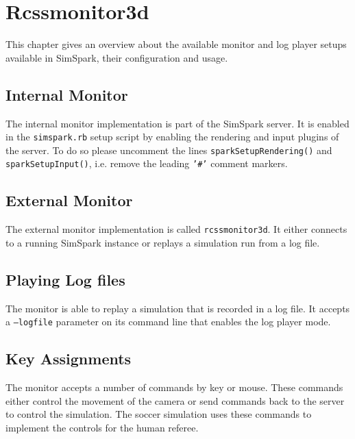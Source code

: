 \chapter{Rcssmonitor3d}
\label{cha:rcssmonitor3d}

This chapter gives an overview about the available monitor and log
player setups available in SimSpark, their configuration and usage.

\section{Internal Monitor}

The internal monitor implementation is part of the SimSpark server. It
is enabled in the \texttt{simspark.rb} setup script by enabling the
rendering and input plugins of the server. To do so please uncomment
the lines \texttt{sparkSetupRendering()} and
\texttt{sparkSetupInput()}, i.e. remove the leading \texttt{'\#'} comment markers.

\section{External Monitor}

The external monitor implementation is called
\texttt{rcssmonitor3d}. It either connects to a running SimSpark
instance or replays a simulation run from a log file.

\section{Playing Log files}

The monitor is able to replay a simulation that is recorded in a log
file. It accepts a \texttt{--logfile} parameter on its command line
that enables the log player mode.

\section{Key Assignments}

The monitor accepts a number of commands by key or mouse. These
commands either control the movement of the camera or send commands
back to the server to control the simulation. The soccer simulation
uses these commands to implement the controls for the human referee.


